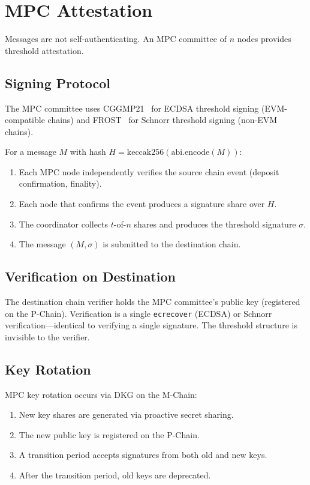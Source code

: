 \section{MPC Attestation}


Messages are not self-authenticating. An MPC committee of $n$ nodes provides threshold attestation.

\subsection{Signing Protocol}

The MPC committee uses CGGMP21~\cite{cggmp2021} for ECDSA threshold signing (EVM-compatible chains) and FROST~\cite{frost2020} for Schnorr threshold signing (non-EVM chains).

For a message $M$ with hash $H = \text{keccak256}(\text{abi.encode}(M))$:

\begin{enumerate}[leftmargin=2em]
\item Each MPC node independently verifies the source chain event (deposit confirmation, finality).
\item Each node that confirms the event produces a signature share over $H$.
\item The coordinator collects $t$-of-$n$ shares and produces the threshold signature $\sigma$.
\item The message $(M, \sigma)$ is submitted to the destination chain.
\end{enumerate}

\subsection{Verification on Destination}

The destination chain verifier holds the MPC committee's public key (registered on the P-Chain). Verification is a single \texttt{ecrecover} (ECDSA) or Schnorr verification---identical to verifying a single signature. The threshold structure is invisible to the verifier.

\subsection{Key Rotation}

MPC key rotation occurs via DKG on the M-Chain:
\begin{enumerate}[leftmargin=2em]
\item New key shares are generated via proactive secret sharing.
\item The new public key is registered on the P-Chain.
\item A transition period accepts signatures from both old and new keys.
\item After the transition period, old keys are deprecated.
\end{enumerate}

